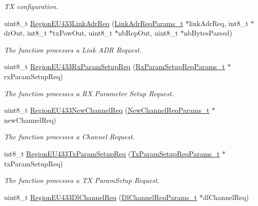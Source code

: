 \begin{DoxyCompactItemize}
\begin{DoxyCompactList}\small\item\em TX configuration. \end{DoxyCompactList}\item 
uint8\+\_\+t \mbox{\hyperlink{group___r_e_g_i_o_n_e_u433_gafd3e374d9048e67d54d1fa90b8d18723}{Region\+E\+U433\+Link\+Adr\+Req}} (\mbox{\hyperlink{group___r_e_g_i_o_n_gad4af503e8d4de1846129e26a799a1e8e}{Link\+Adr\+Req\+Params\+\_\+t}} $\ast$link\+Adr\+Req, int8\+\_\+t $\ast$dr\+Out, int8\+\_\+t $\ast$tx\+Pow\+Out, uint8\+\_\+t $\ast$nb\+Rep\+Out, uint8\+\_\+t $\ast$nb\+Bytes\+Parsed)
\begin{DoxyCompactList}\small\item\em The function processes a Link A\+DR Request. \end{DoxyCompactList}\item 
uint8\+\_\+t \mbox{\hyperlink{group___r_e_g_i_o_n_e_u433_ga0aaed1ad836262927f03ec9f8b63674d}{Region\+E\+U433\+Rx\+Param\+Setup\+Req}} (\mbox{\hyperlink{group___r_e_g_i_o_n_ga7165f282c670c728c36d534df2285157}{Rx\+Param\+Setup\+Req\+Params\+\_\+t}} $\ast$rx\+Param\+Setup\+Req)
\begin{DoxyCompactList}\small\item\em The function processes a RX Parameter Setup Request. \end{DoxyCompactList}\item 
uint8\+\_\+t \mbox{\hyperlink{group___r_e_g_i_o_n_e_u433_ga1df9d3b633c355a6b1d2b7fc1e0e217b}{Region\+E\+U433\+New\+Channel\+Req}} (\mbox{\hyperlink{group___r_e_g_i_o_n_gae2abcdb6dbb843c9faf5fd3009eca9d6}{New\+Channel\+Req\+Params\+\_\+t}} $\ast$new\+Channel\+Req)
\begin{DoxyCompactList}\small\item\em The function processes a Channel Request. \end{DoxyCompactList}\item 
int8\+\_\+t \mbox{\hyperlink{group___r_e_g_i_o_n_e_u433_ga3536c80fcee7f9f673bce7e3dbd50fd2}{Region\+E\+U433\+Tx\+Param\+Setup\+Req}} (\mbox{\hyperlink{group___r_e_g_i_o_n_ga26836ef2996e70410e42ef471073f855}{Tx\+Param\+Setup\+Req\+Params\+\_\+t}} $\ast$tx\+Param\+Setup\+Req)
\begin{DoxyCompactList}\small\item\em The function processes a TX Param\+Setup Request. \end{DoxyCompactList}\item 
uint8\+\_\+t \mbox{\hyperlink{group___r_e_g_i_o_n_e_u433_ga245f30ef549f49611ca2513a3d931033}{Region\+E\+U433\+Dl\+Channel\+Req}} (\mbox{\hyperlink{group___r_e_g_i_o_n_gae0d608ff1f8ea0a430e4f9a4c38ec7f3}{Dl\+Channel\+Req\+Params\+\_\+t}} $\ast$dl\+Channel\+Req)

\end{DoxyCompactItemize}
